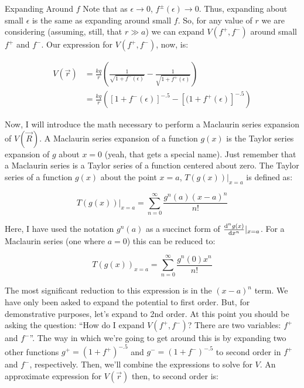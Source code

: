 \begin{homeworkProblem}[Quiz 4]
\begin{homeworkSection}{Expanding Around $f$}
    Note that as $\epsilon \rightarrow 0$, $f^\pm(\epsilon) \rightarrow
    0$. Thus, expanding about small $\epsilon$ is the same as expanding
    around small $f$. So, for any value of $r$ we are considering
    (assuming, still, that $r \gg a$) we can expand $V(f^+,f^-)$ around
    small
    $f^+$ and $f^-$. Our expression for $V(f^+,f^-)$, now, is:

    \begin{align}
        \label{}
        V(\vec{r}) &= \frac{k q}{r} \left(
        \frac{1}{\sqrt{1+f^{-}(\epsilon)}} - 
        \frac{1}{\sqrt{1+ f^{+}(\epsilon)}}
        \right) \nonumber \\
        &= \frac{k q}{r} \left(
        \left[ 1+f^{-}(\epsilon)  \right] ^{-.5} - 
        \left[ (1+ f^{+}(\epsilon)  \right]^{-.5}
        \right) 
    \end{align}

    Now, I will introduce the math necessary to perform a Maclaurin
    series expansion of $V(\vec{R})$. A Maclaurin series expansion of a
    function $g(x)$ is the Taylor series expansion of $g$ about $x=0$
    (yeah, that gets a special name). Just remember that a Maclaurin
    series is a Taylor series of a function centered about zero. The
    Taylor series of a function $g(x)$ about the point $x = a$,
    $T(g(x))|_{x=a}$ is defined as:

    \[
    T(g(x))|_{x=a} = \sum\limits_{n=0}^{\infty}\frac{g^{n}(a) (x-a)^n}{n!}
    \]

    Here, I have used the notation $g^{n}(a)$ as a succinct form of
    $\frac{\mathop{}\!\mathrm{d}^n g(x)}{\mathop{}\!\mathrm{d} x^n}|_{x=a}$. For a Maclaurin series (one
    where $a=0$) this can be reduced to:

    \[
    T(g(x))_{x=a} = \sum\limits_{n=0}^{\infty}\frac{g^{n}(0) x^n}{n!}
    \]

    The most significant reduction to this expression is in the
    $(x-a)^n$ term. We have only been asked to expand the potential to
    first order. But, for demonstrative purposes, let's expand to 2nd
    order. At this point you should be asking the question: ``How do I
    expand $V(f^+,f^-)$? There are two variables: $f^+$ and $f^-$''. The
    way in which we're going to get around this is by expanding two
    other functions $g^+ = (1+f^+)^{-.5}$ and $g^- = (1+f^-)^{-.5}$ to
    second order in $f^+$ and $f^-$, respectively. Then, we'll combine
    the expressions to solve for $V$. An approximate expression for
    $V(\vec{r})$ then, to second order is:
    

\end{homeworkSection}
\end{homeworkProblem}
